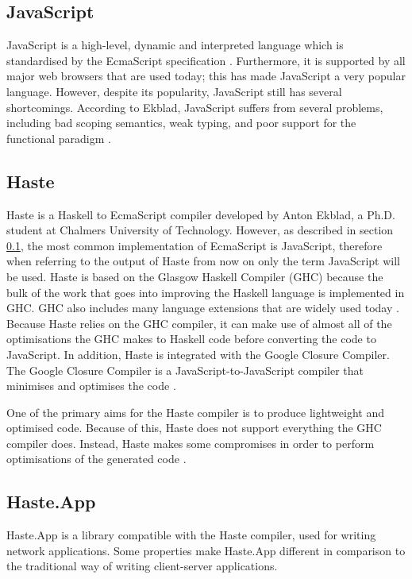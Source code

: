 \documentclass[a4paper]{article}
\begin{document}
\subsection{JavaScript}
\label{sec:javascript}
JavaScript is a high-level, dynamic and interpreted language which is standardised by the EcmaScript specification \cite{flanagan2011javascript}. Furthermore, it is supported by all major web browsers that are used today; this has made JavaScript a very popular language. However, despite its popularity, JavaScript still has several shortcomings. According to Ekblad, JavaScript suffers from several problems, including bad scoping semantics, weak typing, and poor support for the functional paradigm \cite{ekblad2012towards}. 

\subsection{Haste}
Haste is a Haskell to EcmaScript compiler developed by Anton Ekblad, a Ph.D. student at Chalmers University of Technology. However, as described in section \ref{sec:javascript}, the most common implementation of EcmaScript is JavaScript, therefore when referring to the output of Haste from now on only the term JavaScript will be used. Haste is based on the Glasgow Haskell Compiler (GHC) \cite{ghc-compiler} because the bulk of the work that goes into improving the Haskell language is implemented in GHC. GHC also includes many language extensions that are widely used today \cite{ekblad2015seamless}. Because Haste relies on the GHC compiler, it can make use of almost all of the optimisations the GHC makes to Haskell code before converting the code to JavaScript. In addition, Haste is integrated with the Google Closure Compiler. The Google Closure Compiler is a JavaScript-to-JavaScript compiler that minimises and optimises the code \cite{google-closure}.

One of the primary aims for the Haste compiler is to produce lightweight and optimised code. Because of this, Haste does not support everything the GHC compiler does. Instead, Haste makes some compromises in order to perform optimisations of the generated code \cite{ekblad2015seamless}.

\subsection{Haste.App}
Haste.App is a library compatible with the Haste compiler, used for writing network applications. Some properties make Haste.App different in comparison to the traditional way of writing client-server applications. 
\end{document}
